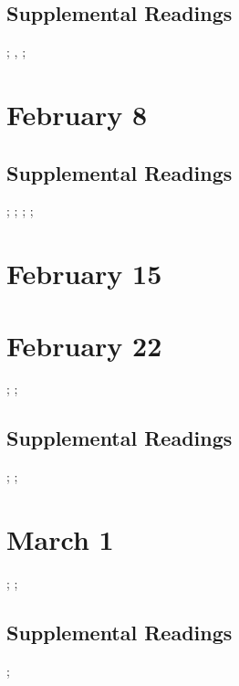\documentclass[11pt]{article}
\begin{document}
\cite{Oldenziel:1999vk}

\subsection{Supplemental Readings}
\cite{Maines:1999uw}; \cite{Rossiter:1982vn}, \cite{Tichi:1987wb}; \cite{Hacker:1989tm}


\section{February 8}

\cite{Strom:1992wx}

\subsection{Supplemental Readings}
\cite{Davies:1982vb}; \cite{Rakow:1992vx}; \cite{Pursell:1993td}; \cite{Tone:2001to}; \cite{Benson:1987wl}  

\section{February 15}

\cite{Hicks:2016uj}

\section{February 22}

\cite{Nakamura:2014gp}; \cite{Ensmenger:2010tc}; \cite{Haraway:1991uz}


\subsection{Supplemental Readings}

\cite{Ensmenger:2010te}; \cite{Milkman:1987tl}; \cite{Shetterly:2016vl}


\section{March 1}

\cite[][(selected excerpts)]{Levy:1984ut}; \cite{Eglash:2002wk}; \cite{Lagesen:2008vy}

\subsection{Supplemental Readings}

\cite{Kocurek:2015cg}; \cite{Losse:2012um}
\end{document}
